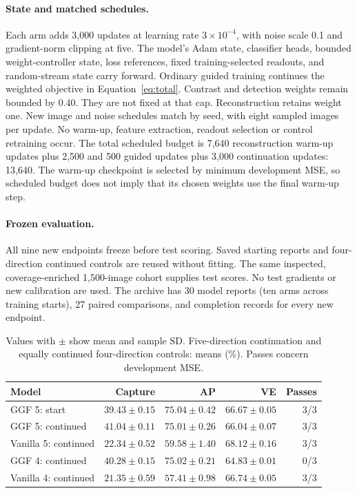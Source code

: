 \paragraph{State and matched schedules.}
Each arm adds 3,000 updates at learning rate $3\times10^{-4}$, with noise
scale 0.1 and gradient-norm clipping at five. The model's Adam state,
classifier heads, bounded weight-controller state, loss references, fixed
training-selected readouts, and random-stream state carry forward. Ordinary
guided training continues the weighted objective in Equation~\ref{eq:total}.
Contrast and detection weights remain bounded by 0.40. They are not fixed
at that cap. Reconstruction retains weight one. New image and noise schedules
match by seed, with eight sampled images per update. No warm-up, feature
extraction, readout selection or control retraining occur.
The total scheduled budget is 7,640 reconstruction warm-up updates plus
2,500 and 500 guided updates plus 3,000 continuation updates: 13,640.
The warm-up checkpoint is selected by minimum development MSE, so scheduled
budget does not imply that its chosen weights use the final warm-up step.

\paragraph{Frozen evaluation.}
All nine new endpoints freeze before test scoring. Saved starting reports
and four-direction continued controls are reused without fitting. The same
inspected, coverage-enriched 1,500-image cohort supplies test
scores. No test gradients or new calibration are used.
The archive has 30 model reports (ten arms across training starts), 27 paired
comparisons, and completion records for every new endpoint.

\begin{table}[t]\centering\small
\caption{Values with $\pm$ show mean and sample SD. Five-direction continuation and equally continued four-direction
controls: means (\%). Passes concern development MSE.}
\label{tab:continuation5-means}
\begin{tabular}{@{}lrrrr@{}}\hline
Model & Capture & AP & VE & Passes\\\hline
GGF 5: start & $39.43\pm0.15$ & $75.04\pm0.42$ & $66.67\pm0.05$ & 3/3\\
GGF 5: continued & $41.04\pm0.11$ & $75.01\pm0.26$ & $66.04\pm0.07$ & 3/3\\
Vanilla 5: continued & $22.34\pm0.52$ & $59.58\pm1.40$ & $68.12\pm0.16$ & 3/3\\
GGF 4: continued & $40.28\pm0.15$ & $75.02\pm0.21$ & $64.83\pm0.01$ & 0/3\\
Vanilla 4: continued & $21.35\pm0.59$ & $57.41\pm0.98$ & $66.74\pm0.05$ & 3/3\\\hline
\end{tabular}\end{table}

